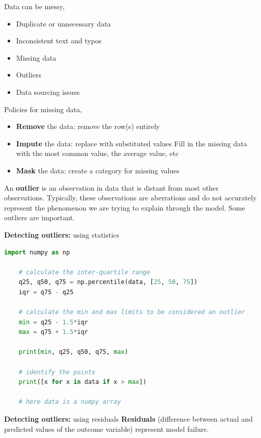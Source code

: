 \documentclass{article}
\theoremstyle{mytheoremstyle}
\theoremstyle{mytheoremstyle}
\theoremstyle{myproblemstyle}
\begin{document}
    \noindent Data can be messy,
    \begin{itemize}
    	\item Duplicate or unnecessary data
	\item Inconsistent text and typos
	\item Missing data
	\item Outliers
	\item Data sourcing issues
    \end{itemize}

    \noindent Policies for missing data,
    \begin{itemize}
    	\item \textbf{Remove} the data: remove the row(s) entirely
	\item \textbf{Impute} the data: replace with substituted values
		Fill in the missing data with the most common value,
		the average value, etc
	\item \textbf{Mask} the data: create a category for missing 
		values
    \end{itemize}

    \noindent An \textbf{outlier} is an observation in data that 
    is distant from most other observations. Typically, these observations
    are aberrations and do not accurately represent the phenomenon we
    are trying to explain through the model. Some outliers are important.

    \vspace{1cm}

    \noindent \textbf{Detecting outliers:} using statistics
    \begin{lstlisting}[language=Python]
    import numpy as np

    # calculate the inter-quartile range
    q25, q50, q75 = np.percentile(data, [25, 50, 75])
    iqr = q75 - q25

    # calculate the min and max limits to be considered an outlier
    min = q25 - 1.5*iqr
    max = q75 + 1.5*iqr

    print(min, q25, q50, q75, max)

    # identify the points
    print([x for x in data if x > max])

    # here data is a numpy array
    \end{lstlisting}

    \vspace{1cm}

    \noindent \textbf{Detecting outliers:} using residuals
    \noindent \textbf{Residuals} (difference between actual and predicted
    values of the outcome variable) represent model failure.
\end{document}

